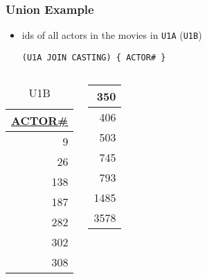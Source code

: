 \documentclass[dvipsnames]{beamer}
\theoremstyle{plain}
\begin{document}
\begin{frame}[fragile]
  \frametitle{Union Example}

  \begin{itemize}
    \item ids of all actors in the movies in \texttt{U1A}
      (\texttt{U1B})
    \begin{lstlisting}
(U1A JOIN CASTING) { ACTOR# }
    \end{lstlisting}
  \end{itemize}

  \vspace{-10pt}
  \begin{columns}[b]
    \begin{tiny}
    \begin{table}
      \caption{U1B}
      \begin{tabular}{|r|}\hline
\underline{ACTOR\#}\\[2pt]\hline\hline
                  9\\\hline
                 26\\\hline
                138\\\hline
                187\\\hline
                282\\\hline
                302\\\hline
                308\\\hline
      \end{tabular}
    \end{table}
    \end{tiny}

    \begin{tiny}
    \begin{table}
      \begin{tabular}{|r|}\hline
                350\\\hline
                406\\\hline
                503\\\hline
                745\\\hline
                793\\\hline
               1485\\\hline
               3578\\\hline
      \end{tabular}
    \end{table}
    \end{tiny}
  \end{columns}
\end{frame}
\end{document}
